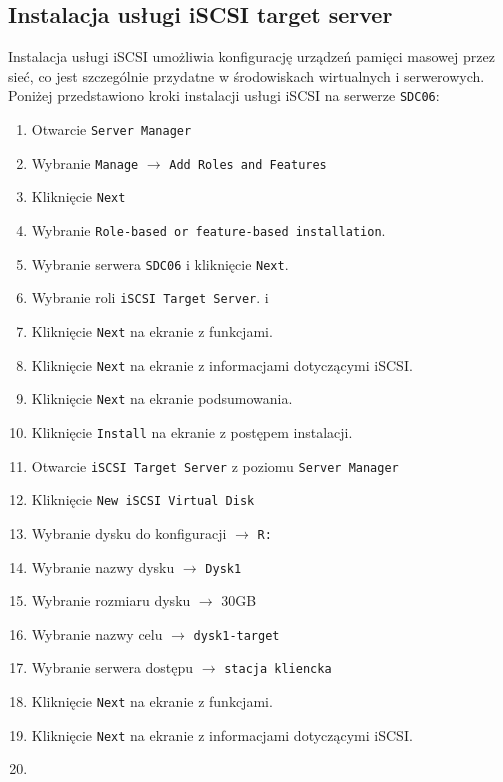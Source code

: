 \subsection{Instalacja usługi iSCSI target server}
Instalacja usługi iSCSI umożliwia konfigurację urządzeń pamięci masowej przez sieć, co jest szczególnie przydatne w środowiskach wirtualnych i serwerowych. Poniżej przedstawiono kroki instalacji usługi iSCSI na serwerze \texttt{SDC06}:
\begin{enumerate}
	\item Otwarcie \texttt{Server Manager}
	\item Wybranie \texttt{Manage} $\rightarrow$ \texttt{Add Roles and Features}
	\item Kliknięcie \texttt{Next}
	\item Wybranie \texttt{Role-based or feature-based installation}. 
	\item Wybranie serwera \texttt{SDC06} i kliknięcie \texttt{Next}. 
	\item Wybranie roli \texttt{iSCSI Target Server}. i 
	\item Kliknięcie \texttt{Next} na ekranie z funkcjami. 
	\item Kliknięcie \texttt{Next} na ekranie z informacjami dotyczącymi iSCSI.
	\item Kliknięcie \texttt{Next} na ekranie podsumowania. 
	\item Kliknięcie \texttt{Install} na ekranie z postępem instalacji. 
	\item Otwarcie \texttt{iSCSI Target Server} z poziomu \texttt{Server Manager} 
	\item Kliknięcie \texttt{New iSCSI Virtual Disk} 
	\item Wybranie dysku do konfiguracji $\rightarrow$ \texttt{R:} 
	\item Wybranie nazwy dysku $\rightarrow$ \texttt{Dysk1} 
	\item Wybranie rozmiaru dysku $\rightarrow$ 30GB 
	\item Wybranie nazwy celu $\rightarrow$ \texttt{dysk1-target} 
	\item Wybranie serwera dostępu $\rightarrow$ \texttt{stacja kliencka} 
	\item Kliknięcie \texttt{Next} na ekranie z funkcjami. 
	\item Kliknięcie \texttt{Next} na ekranie z informacjami dotyczącymi iSCSI.
	\item 
\end{enumerate}

